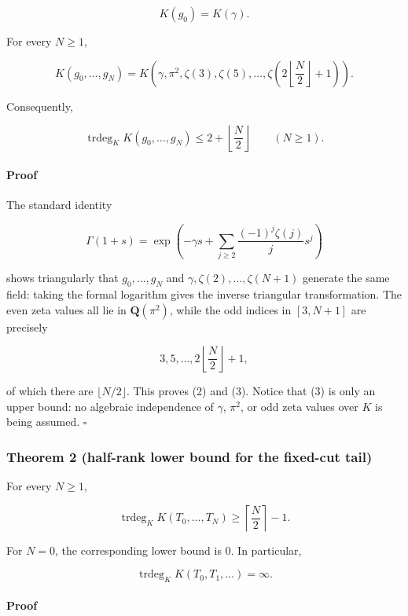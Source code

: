 \documentclass[11pt]{article}
\theoremstyle{keio}
\theoremstyle{definition}
\theoremstyle{remark}
\begin{document}
\[
 K(g_0)=K(\gamma).
\]

For every \(N\ge1\),

\[
 \boxed{
 K(g_0,\ldots,g_N)
 =K\!\left(\gamma,\pi^2,\zeta(3),\zeta(5),\ldots,
 \zeta\!\left(2\left\lfloor\frac N2\right\rfloor+1\right)\right).}       \tag{GT-2}
\]

Consequently,

\[
 \operatorname{trdeg}_K K(g_0,\ldots,g_N)
 \le 2+\left\lfloor\frac N2\right\rfloor \qquad(N\ge1).                 \tag{GT-3}
\]

\paragraph{Proof}

The standard identity

\[
 \Gamma(1+s)=
 \exp\!\left(-\gamma s+\sum_{j\ge2}\frac{(-1)^j\zeta(j)}j s^j\right)
\]

shows triangularly that \(g_0,\ldots,g_N\) and
\(\gamma,\zeta(2),\ldots,\zeta(N+1)\) generate the same field: taking the
formal logarithm gives the inverse triangular transformation. The even zeta
values all lie in \(\mathbf Q(\pi^2)\), while the odd indices in
\([3,N+1]\) are precisely

\[
 3,5,\ldots,2\left\lfloor\frac N2\right\rfloor+1,
\]

of which there are \(\lfloor N/2\rfloor\). This proves (2) and (3). Notice
that (3) is only an upper bound: no algebraic independence of \(\gamma\),
\(\pi^2\), or odd zeta values over \(K\) is being assumed. \(\square\)

\subsubsection{Theorem 2 (half-rank lower bound for the fixed-cut tail)}

For every \(N\ge1\),

\[
 \boxed{
 \operatorname{trdeg}_K K(T_0,\ldots,T_N)
 \ge \left\lceil\frac N2\right\rceil-1.}                                  \tag{GT-4}
\]

For \(N=0\), the corresponding lower bound is \(0\). In particular,

\[
 \operatorname{trdeg}_K K(T_0,T_1,\ldots)=\infty.                          \tag{GT-5}
\]

\paragraph{Proof}
\end{document}
